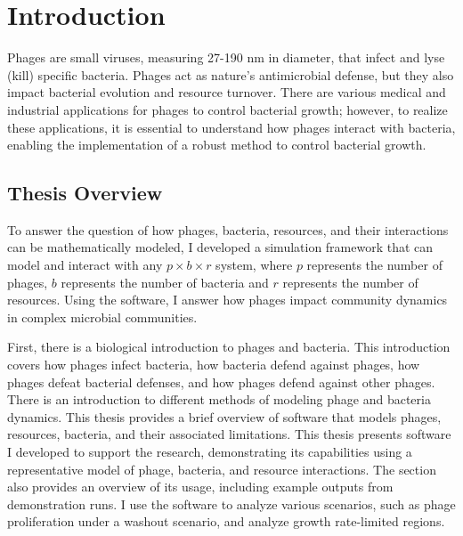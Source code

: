 \chapter{Introduction}
\label{Introduction}
Phages are small viruses, measuring 27-190 nm in diameter, that infect and lyse (kill) specific bacteria. 
Phages act as nature's antimicrobial defense, but they also impact bacterial evolution and resource turnover. 
There are various medical and industrial applications for phages to control bacterial growth; however, to realize these applications, it is essential to understand how phages interact with bacteria, enabling the implementation of a robust method to control bacterial growth. 

\section{Thesis Overview}
To answer the question of how phages, bacteria, resources, and their interactions can be mathematically modeled, I developed a simulation framework that can model and interact with any $p\times b\times r$ system, where $p$ represents the number of phages, $b$ represents the number of bacteria and $r$ represents the number of resources. 
Using the software, I answer how phages impact community dynamics in complex microbial communities. 

First, there is a biological introduction to phages and bacteria. 
This introduction covers how phages infect bacteria, how bacteria defend against phages, how phages defeat bacterial defenses, and how phages defend against other phages. 
There is an introduction to different methods of modeling phage and bacteria dynamics. 
This thesis provides a brief overview of software that models phages, resources, bacteria, and their associated limitations. 
This thesis presents software I developed to support the research, demonstrating its capabilities using a representative model of phage, bacteria, and resource interactions. 
The section also provides an overview of its usage, including example outputs from demonstration runs.
I use the software to analyze various scenarios, such as phage proliferation under a washout scenario, and analyze growth rate-limited regions. 

